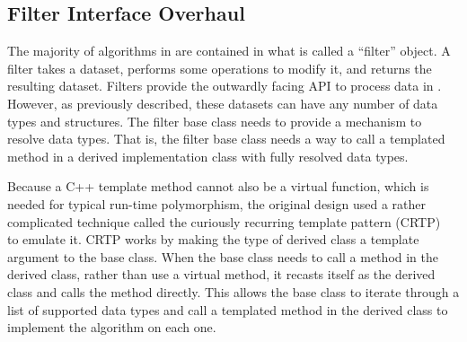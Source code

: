 \subsection{Filter Interface Overhaul}
\label{sec:filter-overhaul}


The majority of algorithms in \vtkm are contained in what is called a ``filter'' object.
A filter takes a dataset, performs some operations to modify it, and returns the resulting dataset.
Filters provide the outwardly facing API to process data in \vtkm.
However, as previously described, these datasets can have any number of data types and structures.
The \vtkm filter base class needs to provide a mechanism to resolve data types.
That is, the filter base class needs a way to call a templated method in a derived implementation class with fully resolved data types.

Because a C++ template method cannot also be a virtual function, which is needed for typical run-time polymorphism, the original design used a rather complicated technique called the curiously recurring template pattern (CRTP)~\citep{Coplien1995} to emulate it.
CRTP works by making the type of derived class a template argument to the base class.
When the base class needs to call a method in the derived class, rather than use a virtual method, it recasts itself as the derived class and calls the method directly.
This allows the base class to iterate through a list of supported data types and call a templated method in the derived class to implement the algorithm on each one.


